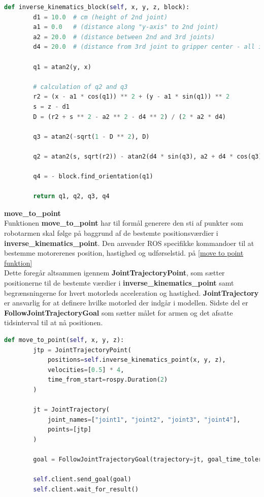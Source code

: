 \begin{lstlisting}[caption=inverse\_kinematics funktion, label=inverse kinematics funktion, language=Python]
    def inverse_kinematics_block(self, x, y, z, block):
        d1 = 10.0  # cm (height of 2nd joint)
        a1 = 0.0   # (distance along "y-axis" to 2nd joint)
        a2 = 20.0  # (distance between 2nd and 3rd joints)
        d4 = 20.0  # (distance from 3rd joint to gripper center - all inclusive, ie. also 4th joint)

        q1 = atan2(y, x)

        # calculation of q2 and q3
        r2 = (x - a1 * cos(q1)) ** 2 + (y - a1 * sin(q1)) ** 2
        s = z - d1
        D = (r2 + s ** 2 - a2 ** 2 - d4 ** 2) / (2 * a2 * d4)

        q3 = atan2(-sqrt(1 - D ** 2), D)

        q2 = atan2(s, sqrt(r2)) - atan2(d4 * sin(q3), a2 + d4 * cos(q3)) - pi / 2

        q4 = - block.find_orientation(q1)

        return q1, q2, q3, q4
\end{lstlisting}

\textbf{move\_to\_point}\\
Funktionen \textbf{move\_to\_point} har til formål generere den sti af punkter som robotarmen skal følge på baggrund af de bestemte positionsværdier i \textbf{inverse\_kinematics\_point}. Den anvender ROS specifikke kommandoer til at bestemme motorerenes position, hastighed og udførselstid. på \autoref{move to point funktion}\\

Dette foregår altsammen igennem \textbf{JointTrajectoryPoint}, som sætter positionerne til de bestemte værdier i \textbf{inverse\_kinematics\_point} samt begrænsningerne for hvert motorleds acceleration og hastighed. \textbf{JointTrajectory} er ansvarlig for at definere hvilke motorled der indgår i modellen. Sidste del er \textbf{FollowJointTrajectoryGoal} som sætter målet for armen og det afsatte tidsinterval til at nå positionen.\\

\begin{lstlisting}[caption=move\_to\_point funktion, label=move to point funktion, language=Python]
    def move_to_point(self, x, y, z):
        jtp = JointTrajectoryPoint(
            positions=self.inverse_kinematics_point(x, y, z),
            velocities=[0.5] * 4,
            time_from_start=rospy.Duration(2)
        )

        jt = JointTrajectory(
            joint_names=["joint1", "joint2", "joint3", "joint4"],
            points=[jtp]
        )

        goal = FollowJointTrajectoryGoal(trajectory=jt, goal_time_tolerance=rospy.Duration(4))

        self.client.send_goal(goal)
        self.client.wait_for_result()
\end{lstlisting}

